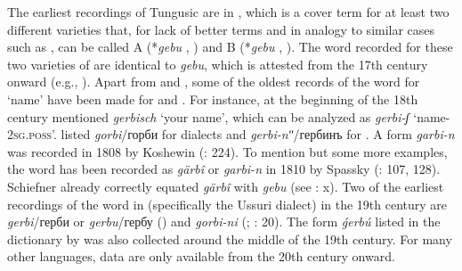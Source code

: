 \documentclass[output=paper,colorlinks,citecolor=brown]{langscibook}
\begin{document}
The earliest recordings of Tungusic are in , which is a cover term for at least two different varieties that, for lack of better terms and in analogy to similar cases such as , can be called  A (*\textit{gebu} , \citealt{Kiyose1977}) and  B (*\textit{gebu} , \citealt{Kane1989}). The word recorded for these two varieties of  are identical to  \textit{gebu}, which is attested from the 17th century onward (e.g., \citealt{Norman2013}). Apart from  and , some of the oldest records of the word for ‘name’ have been made for  and . For instance, at the beginning of the 18th century \citet[654]{Witsen1705} mentioned  \textit{gerbisch} ‘your name’, which can be analyzed as \textit{gerbi-ʃ} ‘name-2\textsc{sg.poss}’. \citet[169]{Pallas1786} listed \textit{gorbi}/горби for  dialects and \textit{gerbi-nʺ}/гербинъ for . A form \textit{garbi-n} was recorded in 1808 by Koshewin (\citealt{Klaproth1817}: 224). To mention but some more examples, the word has been recorded as \textit{gärbî} or \textit{garbi-n} in 1810 by Spassky (\citealt{Castrén1856}: 107, 128). Schiefner already correctly equated  \textit{gärbî} with  \textit{gebu} (see \citealt{Castrén1856}: x). Two of the earliest recordings of the word in  (specifically the Ussuri dialect) in the 19th century are \textit{gerbi}/герби or \textit{gerbu}/гербу (\citealt{Brylkin1861}) and \textit{gorbi-ni} (\citealt{Venjukov1862}; \citealt{Alonso2011}: 20). The  form \textit{ǵerbú} listed in the dictionary by \citet{Grube1900} was also collected around the middle of the 19th century. For many other languages, data are only available from the 20th century onward.
\end{document}

